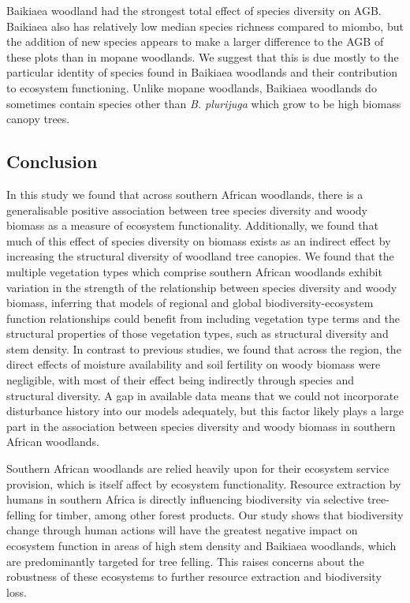 \documentclass[11pt,a4paper]{article}
\begin{document}
Baikiaea woodland had the strongest total effect of species diversity on AGB. Baikiaea also has relatively low median species richness compared to miombo, but the addition of new species appears to make a larger difference to the AGB of these plots than in mopane woodlands. We suggest that this is due mostly to the particular identity of species found in Baikiaea woodlands and their contribution to ecosystem functioning. Unlike mopane woodlands, Baikiaea woodlands do sometimes contain species other than \textit{B. plurijuga} which grow to be high biomass canopy trees. 

\subsection*{Conclusion}

In this study we found that across southern African woodlands, there is a generalisable positive association between tree species diversity and woody biomass as a measure of ecosystem functionality. Additionally, we found that much of this effect of species diversity on biomass exists as an indirect effect by increasing the structural diversity of woodland tree canopies. We found that the multiple vegetation types which comprise southern African woodlands exhibit variation in the strength of the relationship between species diversity and woody biomass, inferring that models of regional and global biodiversity-ecosystem function relationships could benefit from including vegetation type terms and the structural properties of those vegetation types, such as structural diversity and stem density. In contrast to previous studies, we found that across the region, the direct effects of moisture availability and soil fertility on woody biomass were negligible, with most of their effect being indirectly through species and structural diversity. A gap in available data means that we could not incorporate disturbance history into our models adequately, but this factor likely plays a large part in the association between species diversity and woody biomass in southern African woodlands.

Southern African woodlands are relied heavily upon for their ecosystem service provision, which is itself affect by ecosystem functionality. Resource extraction by humans in southern Africa is directly influencing biodiversity via selective tree-felling for timber, among other forest products. Our study shows that biodiversity change through human actions will have the greatest negative impact on ecosystem function in areas of high stem density and Baikiaea woodlands, which are predominantly targeted for tree felling. This raises concerns about the robustness of these ecosystems to further resource extraction and biodiversity loss.
\end{document}
